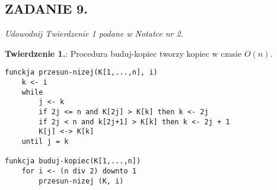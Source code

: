 \documentclass{article}
\begin{document}






    


        




\subsection*{ZADANIE 9.}
\emph{Udowodnij Twierdzenie 1 podane w Notatce nr 2.}
\smallskip

\begin{center}
    \textbf{Twierdzenie 1.}: Procedura buduj-kopiec tworzy kopiec w czasie $O(n)$.

\begin{lstlisting}
funckja przesun-nizej(K[1,...,n], i)
    k <- i 
    while
        j <- k
        if 2j <= n and K[2j] > K[k] then k <- 2j
        if 2j < n and k[2j+1] > K[k] then k <- 2j + 1
        K[j] <-> K[k]
    until j = k

funkcja buduj-kopiec(K[1,...,n])
    for i <- (n div 2) downto 1
        przesun-nizej (K, i)
\end{lstlisting}
\end{center}
\smallskip
\end{document}
